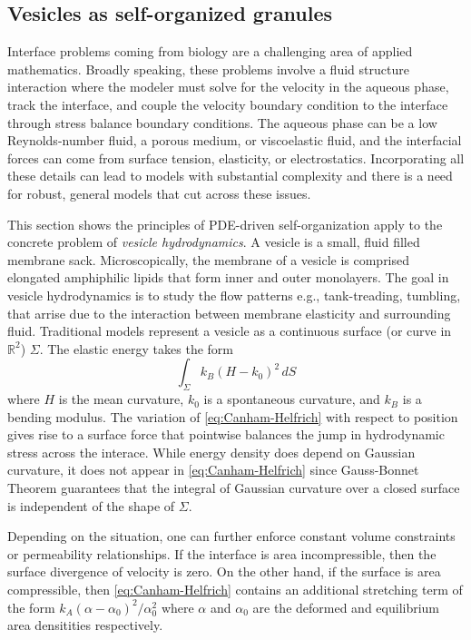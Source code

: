 \subsection{Vesicles as self-organized granules}
\label{sec:vesicles_as_granules}
Interface problems coming from biology are a challenging
area of applied mathematics.  Broadly speaking, these problems
involve a fluid structure interaction where the modeler must
solve for the velocity in the aqueous phase, track the interface,
and couple the velocity boundary condition to the interface through
stress balance boundary conditions.  The aqueous phase can
be a low Reynolds-number fluid, a porous medium, or viscoelastic fluid,
and the interfacial forces can come from surface tension, elasticity,
or electrostatics.
Incorporating all these details can lead to models with substantial
complexity and there is a need for robust, general models that
cut across these issues. 

This section shows the principles of PDE-driven
self-organization apply to the concrete
problem of \emph{vesicle hydrodynamics}.
A vesicle is a small, fluid filled membrane sack.
Microscopically, the membrane of a vesicle is comprised
elongated amphiphilic lipids that form inner and outer monolayers.  
The goal in vesicle hydrodynamics is to study the flow patterns e.g.,
tank-treading, tumbling, that arrise due to the interaction
between membrane elasticity and surrounding fluid.
Traditional models represent a vesicle as a
continuous surface (or curve in $\mathbb{R}^2$) $\Sigma$.
The elastic energy takes the form
\begin{equation}
\label{eq:Canham-Helfrich}
  \int_{\Sigma} k_B(H - k_0)^2\, dS 
\end{equation}
where $H$ is the mean curvature, $k_0$ is a spontaneous curvature,
and $k_B$ is a bending modulus. 
The variation of \eqref{eq:Canham-Helfrich} with respect to position
gives rise to a surface force
that pointwise balances the jump in hydrodynamic stress across the interace.
While energy density does depend on Gaussian curvature,
it does not appear in \eqref{eq:Canham-Helfrich}
since Gauss-Bonnet Theorem guarantees that
the integral of Gaussian curvature over a closed surface is independent of the shape of $\Sigma$.

Depending on the situation,
one can further enforce constant volume constraints or permeability relationships.
If the interface is area incompressible, then the surface divergence
of velocity is zero.  On the other hand, if the surface is area compressible,
then \eqref{eq:Canham-Helfrich} contains an additional stretching term of the
form $k_A(\alpha - \alpha_0)^2/\alpha_0^2$ where $\alpha$ and $\alpha_0$ are the
deformed and equilibrium area densitities respectively. 

